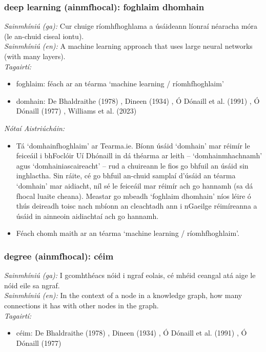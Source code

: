 \subsubsection*{deep learning (ainmfhocal): foghlaim dhomhain}
 \noindent \textit{Sainmhíniú (ga):} Cur chuige ríomhfhoghlama a úsáideann líonraí néaracha móra (le an-chuid ciseal iontu).
\\
 \noindent \textit{Sainmhíniú (en):} A machine learning approach that uses large neural networks (with many layers).
\\
 \noindent \textit{Tagairtí:}
\begin{itemize}
	\item foghlaim: féach ar an téarma `machine learning / ríomhfhoghlaim'
	\item domhain: De Bhaldraithe (1978) \cite{de-bhaldraithe}, Dineen (1934) \cite{dineen}, Ó Dónaill et al. (1991) \cite{focloir-beag}, Ó Dónaill (1977) \cite{odonaill}, Williams et al. (2023) \cite{storchiste}
\end{itemize}

 \noindent \textit{Nótaí Aistriúcháin:}
\begin{itemize}
	\item Tá `domhainfhoghlaim' ar Tearma.ie. Bíonn úsáid `domhain' mar réimír le feiceáil i bhFoclóir Uí Dhónaill in dá théarma ar leith -- `domhainmhachnamh' agus `domhainiascaireacht' -- rud a chuireann le fios go bhfuil an úsáid sin inghlactha. Sin ráite, cé go bhfuil an-chuid samplaí d'úsáid an téarma `domhain' mar aidiacht, níl sé le feiceáil mar réimír ach go hannamh (sa dá fhocal luaite cheana). Meastar go mbeadh `foghlaim dhomhain' níos léire ó thús deireadh toisc nach mbíonn an cleachtadh ann i nGaeilge réimíreanna a úsáid in ainneoin aidiachtaí ach go hannamh.
	\item Féach chomh maith ar an téarma `machine learning / ríomhfhoghlaim'.
\end{itemize}


\subsubsection*{degree (ainmfhocal): céim}
 \noindent \textit{Sainmhíniú (ga):} I gcomhthéacs nóid i ngraf eolais, cé mhéid ceangal atá aige le nóid eile sa ngraf.
\\
 \noindent \textit{Sainmhíniú (en):} In the context of a node in a knowledge graph, how many connections it has with other nodes in the graph.
\\
 \noindent \textit{Tagairtí:}
\begin{itemize}
	\item céim: De Bhaldraithe (1978) \cite{de-bhaldraithe}, Dineen (1934) \cite{dineen}, Ó Dónaill et al. (1991) \cite{focloir-beag}, Ó Dónaill (1977) \cite{odonaill}
\end{itemize}

